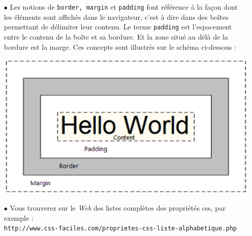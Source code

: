 \documentclass[11pt,a4paper]{article}
\begin{document}
\begin{itemize}
	\item[$\bullet$] Les notions de \texttt{border, margin} et \texttt{padding} font référence à la façon dont les éléments sont affichés dans le navigateur, c'est à dire dans des \og boîtes \fg permettant de délimiter leur contenu. Le terme \texttt{padding} est l'espacement entre le contenu de la boîte et sa bordure. Et la zone situé au délà de la bordure est la marge. Ces concepts sont illustrés sur le schéma ci-dessous :
	      \begin{center}
		      \includegraphics[scale=0.5]{box-model.eps}
	      \end{center}
	\item[$\bullet$] Vous trouverez sur le \textit{Web} des listes complètes des propriétés css, par exemple : \\ {\tt http://www.css-faciles.com/proprietes-css-liste-alphabetique.php}
\end{itemize}
\FinListe
\end{document}
